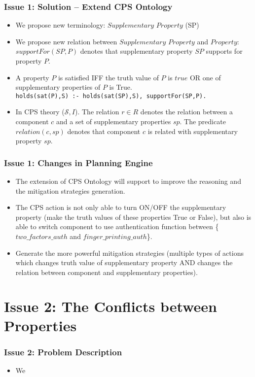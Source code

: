 \documentclass{beamer}
\begin{document}
\begin{frame}[fragile]
	\frametitle{Issue 1: Solution -- Extend CPS Ontology}
	\begin{itemize}
		\item We propose new terminology: $Supplementary$ $Property$ (SP)
		\item We propose new relation between $Supplementary$ $Property$ and $Property$: $supportFor(SP,P)$ denotes that supplementary property $SP$ supports for property $P$.
		\item A property $P$ is satisfied IFF the truth value of $P$ is $true$ OR one of supplementary properties of $P$ is True. \\
		{\tt holds(sat(P),S) :- holds(sat(SP),S), supportFor(SP,P).}
		\item In CPS theory ($\mathcal{S},I$). The relation $r \in R$ denotes the relation between a component $c$ and a set of supplementary properties $sp$. The predicate $relation(c,sp)$ denotes that component $c$ is related with supplementary property $sp$.  
	\end{itemize}
\end{frame}

\begin{frame}[fragile]
	\frametitle{Issue 1: Changes in Planning Engine}
	\begin{itemize}
		\item The extension of CPS Ontology will support to improve the reasoning and the mitigation strategies generation.
		\item The CPS action is not only able to turn ON/OFF the supplementary property (make the truth values of these properties True or False), but also is able to switch component to use authentication function between \{$two\_factors\_auth$ and $finger\_printing\_auth$\}.
		\item Generate the more powerful mitigation strategies (multiple types of actions which changes truth value of supplementary property AND changes the relation between component and supplementary properties). 	   
	\end{itemize}
\end{frame}

\section{Issue 2: The Conflicts between Properties} 
\begin{frame}
	\frametitle{Issue 2: Problem Description}
	\begin{itemize}
		\item We 	   
	\end{itemize}
\end{frame}
\end{document}
